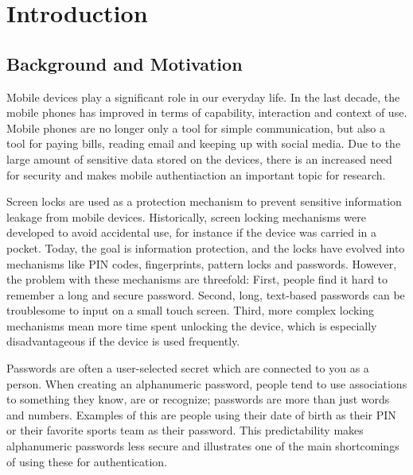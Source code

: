 \chapter{Introduction}\label{chap:introduction}
	
	\clearpage
	\section{Background and Motivation} \label{sec:backgroundandmotivation}
		Mobile devices play a significant role in our everyday life. In the last decade, the mobile phones has improved in terms of capability, interaction and context of use. Mobile phones are no longer only a tool for simple communication, but also a tool for paying bills, reading email and keeping up with social media. Due to the large amount of sensitive data stored on the devices, there is an increased need for security and makes mobile authentiaction an important topic for research.
    
		Screen locks are used as a protection mechanism to prevent sensitive information leakage from mobile devices. Historically, screen locking mechanisms were developed to avoid accidental use, for instance if the device was carried in a pocket. Today, the goal is information protection, and the locks have evolved into mechanisms like PIN codes, fingerprints, pattern locks and passwords. However, the problem with these mechanisms are threefold: First, people find it hard to remember a long and secure password. Second, long, text-based passwords can be troublesome to input on a small touch screen. Third, more complex locking mechanisms mean more time spent unlocking the device, which is especially disadvantageous if the device is used frequently.

    
		Passwords are often a user-selected secret which are connected to you as a person. When creating an alphanumeric password, people tend to use associations to something they know, are or recognize; passwords are more than just words and numbers. Examples of this are people using their date of birth as their PIN or their favorite sports team as their password. This predictability makes alphanumeric passwords less secure and illustrates one of the main shortcomings of using these for authentication.

